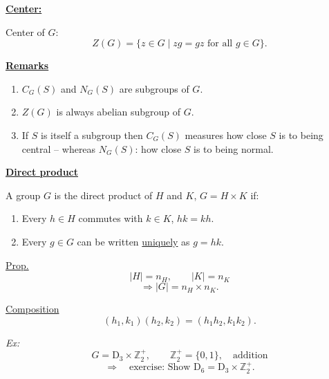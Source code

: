 \documentclass[11pt,a4paper]{article}
\newcommand{\D}{\mathrm{D}}
\begin{document}
\underline{\textbf{Center:}}

Center of $G$:
\[
Z(G)=\{z\in G\mid zg=gz\text{ for all }g\in G\}.
\]

\underline{\textbf{Remarks}}
\begin{enumerate}
\item $C_G(S)$ and $N_G(S)$ are subgroups of $G$.

\item $Z(G)$ is always abelian subgroup of $G$.

\item If $S$ is itself a subgroup then $C_G(S)$ measures how close $S$ is to being central -- whereas $N_G(S)$: how close $S$ is to being normal.
\end{enumerate}

\underline{\textbf{Direct product}}

A group $G$ is the direct product of $H$ and $K$, $G=H\times K$ if:
\begin{enumerate}
\item Every $h\in H$ commutes with $k\in K$, $hk=kh$.

\item Every $g\in G$ can be written \underline{uniquely} as $g=hk$.
\end{enumerate}

\underline{Prop.}
\[
|H|=n_H,\qquad |K|=n_K
\]
\[
\Longrightarrow |G|=n_H\times n_K.
\]

\underline{Composition}
\[
(h_1,k_1)(h_2,k_2)=(h_1h_2,k_1k_2).
\]

\emph{Ex:}
\[
G=\D_3\times\mathbb{Z}_2^+,\qquad
\mathbb{Z}_2^+=\{0,1\},\quad\text{addition}
\]
\[
\Longrightarrow\quad\text{exercise: Show }\D_6=\D_3\times\mathbb{Z}_2^+.
\]
\end{document}

